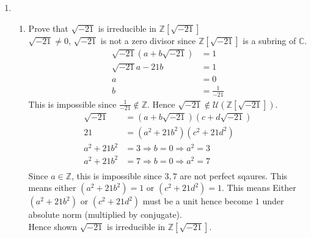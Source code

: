 \documentclass[12pt]{article}
\begin{document}
\begin{enumerate}
	\item 
	\begin{enumerate}
		\item Prove that $\sqrt{-21}$ is irreducible in $\mathbb{Z}[\sqrt{-21}]$\\
			$\sqrt{-21} \neq 0$, $\sqrt{-21}$ is not a zero divisor since
			$\mathbb{Z}[\sqrt{-21}]$ is a subring of $\mathbb{C}$.\\
			\begin{align*}
				\sqrt{-21}(a + b\sqrt{-21}) &= 1 \\
				\sqrt{-21}a - 21b &= 1 \\
				a &= 0\\
				b &= \frac{1}{-21}
			\end{align*}
			This is impossible since $\frac{1}{-21} \not\in
			\mathbb{Z}$. Hence $\sqrt{-21} \not\in
			\mathcal{U}(\mathbb{Z}[\sqrt{-21}])$.\\
			\begin{align*}
				\sqrt{-21} &= (a+b\sqrt{-21})(c+d\sqrt{-21})\\
				21 &= (a^2 + 21b^2)(c^2  + 21d^2)\\
				a^2 + 21b^2 &= 3 \Rightarrow b = 0 \Rightarrow a^2 = 3\\
				a^2 + 21b^2 &= 7 \Rightarrow b = 0 \Rightarrow a^2 = 7\\
			\end{align*}
			Since $a \in \mathbb{Z}$, this is impossible since $3, 7$ are not perfect
			sqaures. This means either $(a^2 + 21b^2)=1$ or $(c^2  + 21d^2)=1$. This
			means Either $(a^2 + 21b^2)$ or $(c^2  + 21d^2)$ must be a unit hence
			become $1$ under absolute norm (multiplied by conjugate).\\
			Hence shown $\sqrt{-21}$ is irreducible in $\mathbb{Z}[\sqrt{-21}]$.


\end{enumerate}
\end{enumerate}
\end{document}
